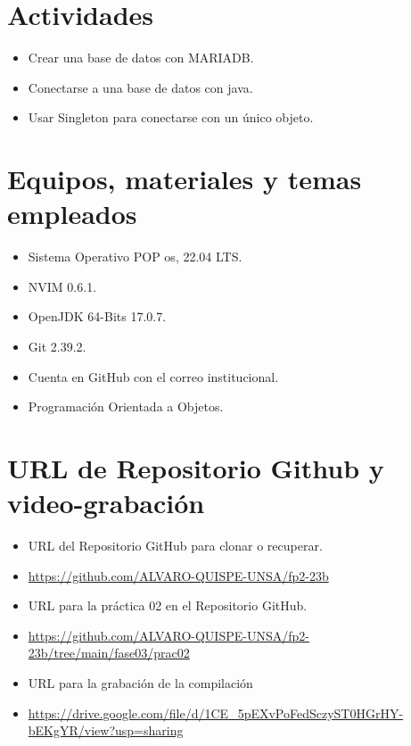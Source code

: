 \documentclass{article}
\begin{document}
  

	\section{Actividades}
	\begin{itemize}		
    \item Crear una base de datos con MARIADB.
		\item Conectarse a una base de datos con java.
    \item Usar Singleton para conectarse con un único objeto.
  \end{itemize}

	\section{Equipos, materiales y temas empleados}
	\begin{itemize}
		\item Sistema Operativo POP os, 22.04 LTS.
		\item NVIM 0.6.1.
		\item OpenJDK 64-Bits 17.0.7.
		\item Git 2.39.2.
		\item Cuenta en GitHub con el correo institucional.
		\item Programación Orientada a Objetos.
	\end{itemize}

	\section{URL de Repositorio Github y video-grabación}
	\begin{itemize}
		\item URL del Repositorio GitHub para clonar o recuperar.
		\item \url{https://github.com/ALVARO-QUISPE-UNSA/fp2-23b}
		\item URL para la práctica 02 en el Repositorio GitHub.
		\item \url{https://github.com/ALVARO-QUISPE-UNSA/fp2-23b/tree/main/fase03/prac02}
		\item URL para la grabación de la compilación
		\item \url{https://drive.google.com/file/d/1CE_5pEXvPoFedSczyST0HGrHY-bEKgYR/view?usp=sharing}
	\end{itemize}
\end{document}
